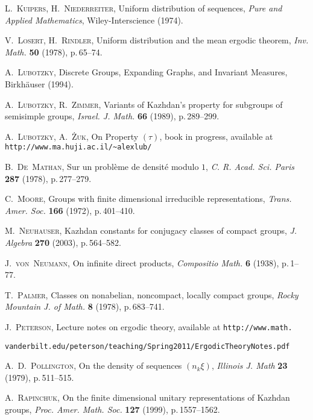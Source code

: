 \documentclass[11pt,english,a4paper]{smfart}
\numberwithin{equation}{section}
\theoremstyle{definition}
\begin{document}
\begin{thebibliography}{99999}
{
\textsc{L.~Kuipers, H.~Niederreiter,}
\newblock Uniform distribution of sequences,
\emph{Pure and Applied Mathematics}, Wiley-Interscience (1974). 

\textsc{V.~Losert, H.~Rindler,}
\newblock Uniform distribution and the mean ergodic theorem,
\newblock \emph{Inv. Math.} \textbf{50} (1978), p.\,65--74.

 \textsc{A.~Lubotzky,}
\newblock Discrete Groups, Expanding Graphs, and Invariant Measures, Birkh\"auser (1994).

\textsc{A.~Lubotzky, R.~Zimmer,}
\newblock Variants of Kazhdan's property for subgroups of semisimple groups,
\newblock \emph{Israel. J. Math.} \textbf{66} (1989), p.\,289--299.

\textsc{A.~Lubotzky, A.~\.Zuk,}
\newblock On Property $(\tau)$, book in progress,
available at\\ \verb=http://www.ma.huji.ac.il/~alexlub/=

\textsc{B.~De~Mathan,}
\newblock Sur un probl\`eme de densit\'e modulo $1$,
\newblock \emph{C. R. Acad. Sci. Paris}  \textbf{287} (1978), p.\,277--279.

 \textsc{C.~Moore,}
\newblock Groups with finite dimensional irreducible representations,
\newblock \emph{Trans. Amer. Soc.} {\bf 166} (1972), p.\,401--410.

 \textsc{M.~Neuhauser,}
\newblock Kazhdan constants for conjugacy classes of compact groups,
\newblock \emph{J. Algebra} {\bf 270} (2003), p.\,564--582. 

\textsc{J.~von~Neumann,} 
\newblock On infinite direct products, 
\newblock \emph{Compositio Math.} {\bf 6} (1938), p.\,1--77.

\textsc{T.~Palmer,} 
\newblock Classes on nonabelian, noncompact, locally compact groups, 
\newblock \emph{Rocky Mountain J. of Math.} {\bf 8} (1978), p.\,683--741.

 \textsc{J.~Peterson,}
\newblock Lecture notes on ergodic theory, available at 
\verb=http://www.math.=
\par\noindent
\verb=vanderbilt.edu/peterson/teaching/Spring2011/ErgodicTheoryNotes.pdf=

\textsc{A.~D.~Pollington,}
\newblock On the density of sequences $(n_k\xi)$,
\newblock \emph{Illinois J. Math}  \textbf{23} (1979), p.\,511--515.

\textsc{A.~Rapinchuk,}
\newblock On the finite dimensional unitary representations of Kazhdan groups,
\newblock \emph{Proc. Amer. Math. Soc.}  \textbf{127} (1999), p.\,1557--1562.

}
\end{thebibliography}
\end{document}
